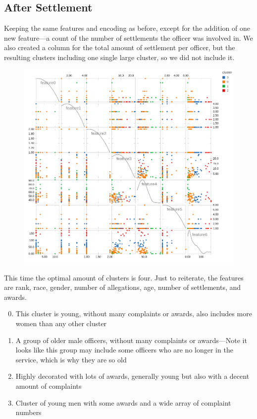\documentclass{article}
\begin{document}
\FloatBarrier

\subsection{After Settlement}
Keeping the same features and encoding as before, except for the addition of one new feature---a count of the number of settlements the officer was involved in. We also created a column for the total amount of settlement per officer, but the resulting clusters including one single large cluster, so we did not include it.


\begin{figure}[h!]
\centering
\includegraphics[width=\textwidth]{cluster2.png}
\end{figure}

This time the optimal amount of clusters is four. Just to reiterate, the features are rank, race, gender, number of allegations, age, number of settlements, and awards.
\begin{enumerate}
\setcounter{enumi}{-1}
\item{This cluster is young, without many complaints or awards, also includes more women than any other cluster}
\item{A group of older male officers, without many complaints or awards---Note it looks like this group may include some officers who are no longer in the service, which is why they are so old}
\item{Highly decorated with lots of awards, generally young but also with a decent amount of complaints}
\item{Cluster of young men with some awards and a wide array of complaint numbers}
\end{enumerate}
\end{document}
